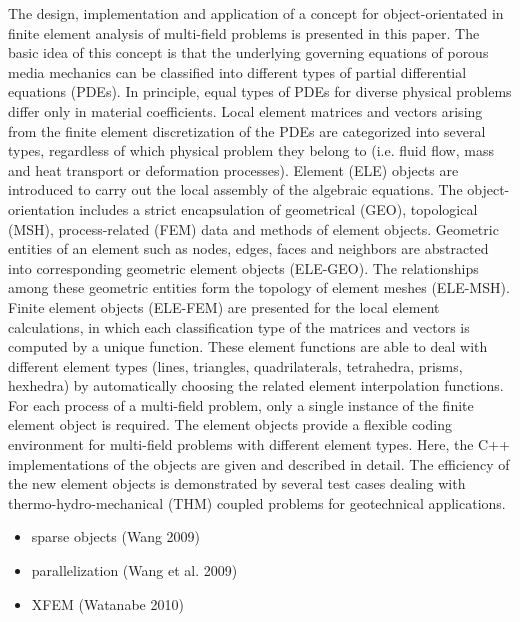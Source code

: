 The design, implementation and application of a concept for
object-orientated in finite element analysis of multi-field
problems is presented in this paper.
%
The basic idea of this concept is that the underlying governing
equations of porous media mechanics can be classified into
different types of partial differential equations (PDEs). In
principle, equal types of PDEs for diverse physical problems
differ only in material coefficients.
%
Local element matrices and vectors arising from the finite element
discretization of the PDEs are categorized into several types,
regardless of which physical problem they belong to (i.e. fluid flow, mass and
heat transport or deformation processes).
%
Element (ELE) objects are introduced to carry out the local
assembly of the algebraic equations. The object-orientation
includes a strict encapsulation of geometrical (GEO), topological
(MSH), process-related (FEM) data and methods of element objects.
%
Geometric entities of an element such as nodes, edges, faces and
 neighbors are abstracted into corresponding geometric element
objects (ELE-GEO). The relationships among these geometric
entities form the topology of element meshes (ELE-MSH).
%
Finite element objects (ELE-FEM) are presented for the local
element calculations, in which each classification type of the 
matrices and vectors is computed by a unique function. These
element functions are able to deal with different element types
(lines, triangles, quadrilaterals, tetrahedra, prisms, hexhedra) by 
automatically choosing the related element interpolation
functions.
%
For each process of a multi-field problem, only a single instance of 
the finite element object is required. The element objects provide a 
flexible coding environment for multi-field problems with different 
element types. Here, the C++ implementations of the objects are given and 
described in detail.
%
The efficiency of the new element objects is demonstrated by
several test cases dealing with thermo-hydro-mechanical (THM)
coupled problems for geotechnical applications.



%


%
%

\begin{itemize}
	\item sparse objects (Wang 2009)
	\item parallelization (Wang et al. 2009)
	\item XFEM (Watanabe 2010)
\end{itemize}